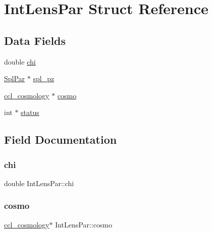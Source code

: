 \hypertarget{struct_int_lens_par}{}\section{Int\+Lens\+Par Struct Reference}
\label{struct_int_lens_par}
\subsection*{Data Fields}
\begin{DoxyCompactItemize}
\item 
double \mbox{\hyperlink{struct_int_lens_par_a57b8438ae32eb2027201fde561ca62b0}{chi}}
\item 
\mbox{\hyperlink{struct_spl_par}{Spl\+Par}} $\ast$ \mbox{\hyperlink{struct_int_lens_par_af03176bfdcc66117c6317bf3a21d4eb2}{spl\+\_\+pz}}
\item 
\mbox{\hyperlink{structccl__cosmology}{ccl\+\_\+cosmology}} $\ast$ \mbox{\hyperlink{struct_int_lens_par_aa2b1c7eb757f6fbf1554a4fc2d45e497}{cosmo}}
\item 
int $\ast$ \mbox{\hyperlink{struct_int_lens_par_a618ab6203724fe7e8a5dc83bd8955b37}{status}}
\end{DoxyCompactItemize}


\subsection{Field Documentation}
\mbox{\label{struct_int_lens_par_a57b8438ae32eb2027201fde561ca62b0}} 
\subsubsection{\texorpdfstring{chi}{chi}}
{\footnotesize\ttfamily double Int\+Lens\+Par\+::chi}

\mbox{\label{struct_int_lens_par_aa2b1c7eb757f6fbf1554a4fc2d45e497}} 
\subsubsection{\texorpdfstring{cosmo}{cosmo}}
{\footnotesize\ttfamily \mbox{\hyperlink{structccl__cosmology}{ccl\+\_\+cosmology}}$\ast$ Int\+Lens\+Par\+::cosmo}

